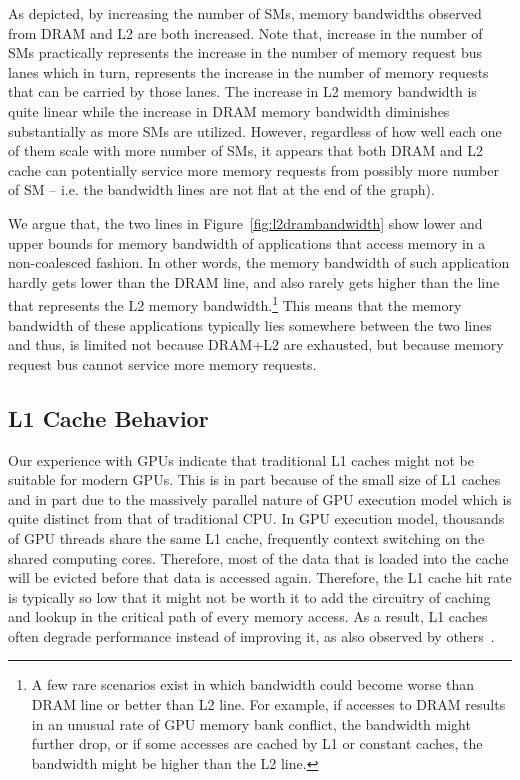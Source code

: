 As depicted, by increasing the number of SMs, memory bandwidths observed from DRAM and L2 are both
increased. Note that, increase in the number of SMs practically represents the increase in the
number of memory request bus lanes which in turn, represents the increase in the number of memory
requests that can be carried by those lanes. The increase in L2 memory bandwidth is quite linear
while the increase in DRAM memory bandwidth diminishes substantially as more SMs are utilized.
However, regardless of how well each one of them scale with more number of SMs, it appears that both
DRAM and L2 cache can potentially service more memory requests from possibly more number of SM --
i.e. the bandwidth lines are not flat at the end of the graph).

 
We argue that, the two lines in Figure~\ref{fig:l2drambandwidth} show lower and upper bounds for
memory bandwidth of applications that access memory in a non-coalesced fashion. In other words, the
memory bandwidth of such application hardly gets lower than the DRAM line, and also rarely gets
higher than the line that represents the L2 memory bandwidth.\footnote{A few rare scenarios exist in
which bandwidth could become worse than DRAM line or better than L2 line. For example, if accesses
to DRAM results in an unusual rate of GPU memory bank conflict, the bandwidth might further drop, or
if some accesses are cached by L1 or constant caches, the bandwidth might be higher than the L2
line.} This means that the memory bandwidth of these applications typically lies somewhere between
the two lines and thus, is limited not because DRAM+L2 are exhausted, but because memory request bus
cannot service more memory requests.


\subsection{L1 Cache Behavior}

Our experience with GPUs indicate that traditional L1 caches might not be suitable for modern GPUs.
This is in part because of the small size of L1 caches and in part due to the massively parallel
nature of GPU execution model which is quite distinct from that of traditional CPU. In GPU execution
model, thousands of GPU threads share the same L1 cache, frequently context switching on the shared
computing cores. Therefore, most of the data that is loaded into the cache will be evicted before
that data is accessed again. Therefore, the L1 cache hit rate is typically so low that it might not
be worth it to add the circuitry of caching and lookup in the critical path of every memory access.
As a result, L1 caches often degrade performance instead of improving it, as also observed by
others~\cite{jia2012characterizing}.


